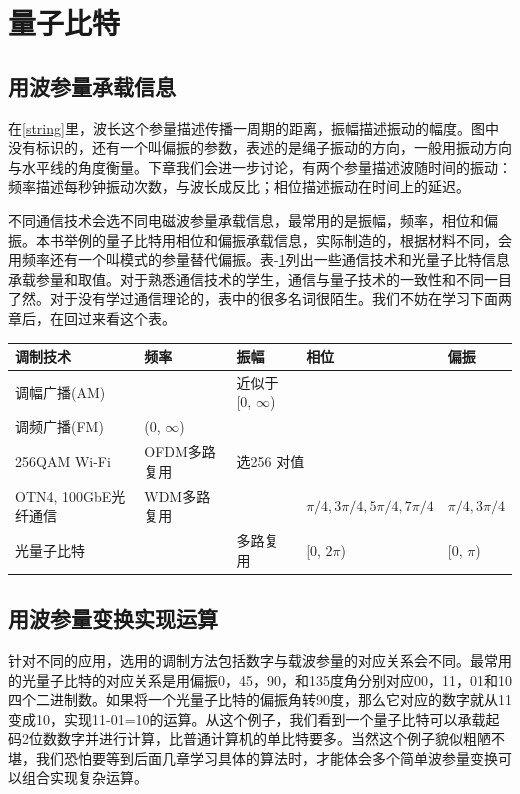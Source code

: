 \documentclass{ctexbook}
\begin{document}
\section{量子比特}
\subsection{用波参量承载信息}
在\ref{string}里，波长这个参量描述传播一周期的距离，振幅描述振动的幅度。图中没有标识的，还有一个叫偏振的参数，表述的是绳子振动的方向，一般用振动方向与水平线的角度衡量。下章我们会进一步讨论，有两个参量描述波随时间的振动：频率描述每秒钟振动次数，与波长成反比；相位描述振动在时间上的延迟。

不同通信技术会选不同电磁波参量承载信息，最常用的是振幅，频率，相位和偏振。本书举例的量子比特用相位和偏振承载信息，实际制造的，根据材料不同，会用频率还有一个叫模式的参量替代偏振。表-\ref{t-modulations}列出一些通信技术和光量子比特信息承载参量和取值。对于熟悉通信技术的学生，通信与量子技术的一致性和不同一目了然。对于没有学过通信理论的，表中的很多名词很陌生。我们不妨在学习下面两章后，在回过来看这个表。
\begin{table}[]\label{t-modulations}
\begin{tabular}{|l|l|l|l|l|}
\hline
调制技术 & 频率 & 振幅 & 相位 & 偏振   \\ \hline
调幅广播(AM) &  & 近似于[0, $\infty$) &  & \\ \hline
调频广播(FM) & (0, $\infty$) &  &  &  \\ \hline
256QAM Wi-Fi & OFDM多路复用 & \multicolumn{2}{l|}{选256 对值} & \\ \hline
OTN4, 100GbE光纤通信 & WDM多路复用 &  & $\pi/4, 3\pi/4, 5\pi/4, 7\pi/4$ & $\pi/4, 3\pi/4$ \\ \hline
光量子比特 &  & 多路复用 & [0, $2\pi$) & [0, $\pi$) \\ \hline
\end{tabular}
\end{table}


\subsection{用波参量变换实现运算}
针对不同的应用，选用的调制方法包括数字与载波参量的对应关系会不同。最常用的光量子比特的对应关系是用偏振0，45，90，和135度角分别对应00，11，01和10四个二进制数。如果将一个光量子比特的偏振角转90度，那么它对应的数字就从11变成10，实现11-01=10的运算。从这个例子，我们看到一个量子比特可以承载起码2位数数字并进行计算，比普通计算机的单比特要多。当然这个例子貌似粗陋不堪，我们恐怕要等到后面几章学习具体的算法时，才能体会多个简单波参量变换可以组合实现复杂运算。
\end{document}
